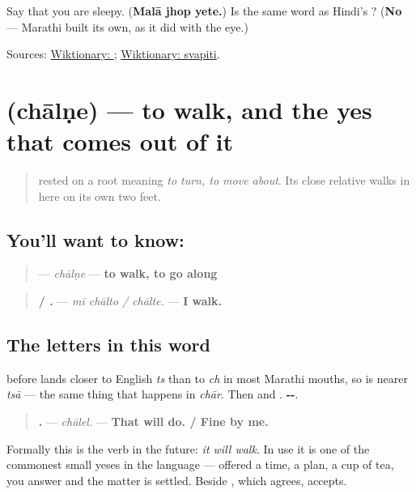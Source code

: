 \begin{tcolorbox}[breakable,colback=teal!4,colframe=teal!35!black,title={Before you move on}]
Say that you are sleepy. (\textbf{Malā jhop yete.}) Is \textbf{} the same word as Hindi's \textbf{}? (\textbf{No} — Marathi built its own, as it did with the eye.)

Sources: \href{https://en.wiktionary.org/wiki/\%E0\%A4\%9D\%E0\%A5\%8B\%E0\%A4\%AA}{Wiktionary: }; \href{https://en.wiktionary.org/wiki/\%E0\%A4\%B8\%E0\%A5\%8D\%E0\%A4\%B5\%E0\%A4\%AA\%E0\%A4\%BF\%E0\%A4\%A4\%E0\%A4\%BF}{Wiktionary: svapiti}.
\end{tcolorbox}
\section[\texorpdfstring{\mr{चालणे} (chālṇe)}{चालणे (chālṇe)}]{ (chālṇe) — to walk, and the yes that comes out of it}

\label{lesson:MR-C23-chalne}



\begin{quote}
\textbf{} rested on a root meaning \emph{to turn, to move about}. Its close relative walks in here on its own two feet.
\end{quote}

\subsection*{You'll want to know: }
\begin{quote}
\textbf{} — \emph{chālṇe} — \textbf{to walk, to go along}
\end{quote}

\begin{quote}
\textbf{  / .} — \emph{mī chālto / chālte.} — \textbf{I walk.}
\end{quote}

\subsection*{The letters in this word}
\textbf{} before \textbf{} lands closer to English \emph{ts} than to \emph{ch} in most Marathi mouths, so \textbf{} is nearer \emph{tsā} — the same thing that happens in \emph{chār}. Then \textbf{} and \textbf{}. \textbf{--}.

\begin{grammarlens}[title={Grammar Lens: the yes that means it will walk}]
\begin{quote}
\textbf{.} — \emph{chālel.} — \textbf{That will do. / Fine by me.}
\end{quote}

Formally this is the verb in the future: \emph{it will walk}. In use it is one of the commonest small yeses in the language — offered a time, a plan, a cup of tea, you answer \textbf{} and the matter is settled. Beside \textbf{}, which agrees, \textbf{} accepts.
\end{grammarlens}

